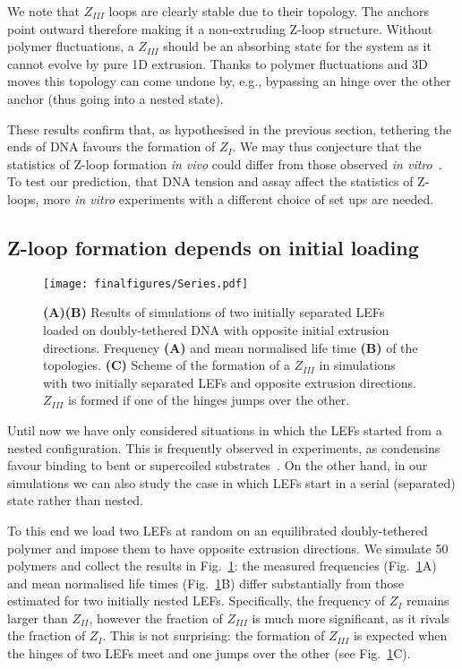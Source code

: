 \documentclass[aps,prl,twocolumn,a4paper,10pt,notitlepage,footinbib,nobalancelastpage,superscriptaddress,showpacs,floatfix]{revtex4-1}%
\begin{document}
We note that $Z_{III}$ loops are clearly stable due to their topology. The anchors point outward therefore making it a non-extruding Z-loop structure. Without polymer fluctuations, a $Z_{III}$ should be an absorbing state for the system as it cannot evolve by pure 1D extrusion. Thanks to polymer fluctuations and 3D moves this topology can come undone by, e.g., bypassing an hinge over the other anchor (thus going into a nested state). 

These results confirm that, as hypothesised in the previous section, tethering the ends of DNA favours the formation of $Z_I$. We may thus conjecture that the statistics of Z-loop formation \emph{in vivo} could differ from those observed \emph{in vitro}~\cite{Kim2020}. To test our prediction, that DNA tension and assay affect the statistics of Z-loops, more \emph{in vitro} experiments with a different choice of set ups are needed. 

\subsection{Z-loop formation depends on initial loading}

\begin{figure}[t!]	
	\texttt{[image: finalfigures/Series.pdf]}
	\caption{\textbf{(A)(B)} Results of simulations of two initially separated LEFs loaded on doubly-tethered DNA with opposite initial extrusion directions. Frequency \textbf{(A)} and mean normalised life time \textbf{(B)} of the topologies. \textbf{(C)} Scheme of the formation of a $Z_{III}$ in simulations with two initially separated LEFs and opposite extrusion directions. $Z_{III}$ is formed if one of the hinges jumps over the other.}
	\label{fig_Series}
\end{figure}

Until now we have only considered situations in which the LEFs started from a nested configuration. This is frequently observed in experiments, as condensins favour binding to bent or supercoiled substrates~\cite{Kimura1997,Kimura1999,Kim2021}. On the other hand, in our simulations we can also study the case in which LEFs start in a serial (separated) state rather than nested.  

To this end we load two LEFs at random on an equilibrated doubly-tethered polymer and impose them to have opposite extrusion directions. We simulate 50 polymers and collect the results in Fig.~\ref{fig_Series}: the measured frequencies (Fig.~\ref{fig_Series}A) and mean normalised life times (Fig.~\ref{fig_Series}B) differ substantially from those estimated for two initially nested LEFs. Specifically, the frequency of $Z_I$ remains larger than $Z_{II}$, however the fraction of $Z_{III}$ is much more significant, as it rivals the fraction of $Z_{I}$. This is not surprising: the formation of $Z_{III}$ is expected when the hinges of two LEFs meet and one jumps over the other (see Fig.~\ref{fig_Series}C).
 
\end{document}
